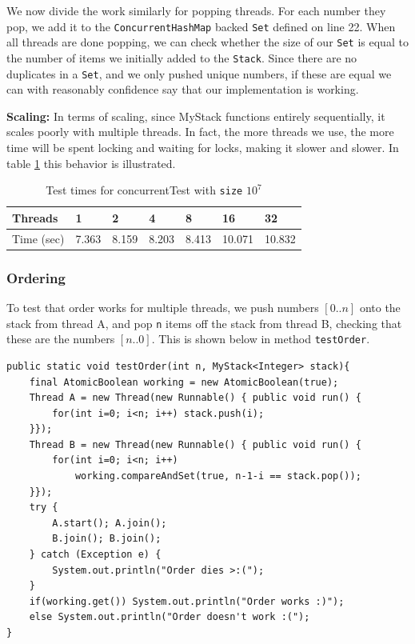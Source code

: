 \documentclass[a5paper]{article}
\begin{document}
We now divide the work similarly for popping threads. For each number they pop, we add it to the \texttt{ConcurrentHashMap} backed \texttt{Set} defined on line 22. 
When all threads are done popping, we can check whether the size of our \texttt{Set} is equal to the number of items we initially added to the \texttt{Stack}.
Since there are no duplicates in a \texttt{Set}, and we only pushed unique numbers, if these are equal we can with reasonably confidence say that our implementation is working.

\textbf{Scaling:} In terms of scaling, since MyStack functions entirely sequentially, it scales poorly with multiple threads. In fact, the more threads we use, the more time will be spent 
locking and waiting for locks, making it slower and slower. In table \ref{table:concTest} this behavior is illustrated.

\begin{table}[ht!]
\centering
\begin{tabular}{|l|l|l|l|l|l|l|}
\hline
Threads & 1 & 2 & 4 & 8 & 16 & 32 \\ \hline
Time (sec) & 7.363 & 8.159 & 8.203 & 8.413 & 10.071 & 10.832 \\ \hline
\end{tabular}
\caption{Test times for concurrentTest with \texttt{size} $10^7$}
\label{table:concTest}
\end{table}
\subsubsection{Ordering} \label{sec:ordering}
To test that order works for multiple threads, we push numbers $[0..n]$ onto the stack from thread A, and pop \texttt{n} items off the stack from thread B,
checking that these are the numbers $[n..0]$.
This is shown below in method \texttt{testOrder}.

\begin{lstlisting}
public static void testOrder(int n, MyStack<Integer> stack){
    final AtomicBoolean working = new AtomicBoolean(true);
    Thread A = new Thread(new Runnable() { public void run() {
        for(int i=0; i<n; i++) stack.push(i);
    }});
    Thread B = new Thread(new Runnable() { public void run() {
        for(int i=0; i<n; i++) 
            working.compareAndSet(true, n-1-i == stack.pop());
    }});
    try {
        A.start(); A.join();
        B.join(); B.join();
    } catch (Exception e) { 
        System.out.println("Order dies >:("); 
    }
    if(working.get()) System.out.println("Order works :)");
    else System.out.println("Order doesn't work :(");
}
\end{lstlisting}
\end{document}
